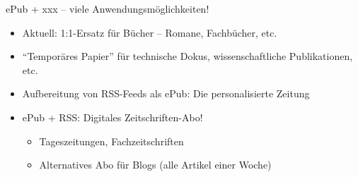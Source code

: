 \begin{frame}{ePub + xxx -- viele Anwendungsmöglichkeiten!}
	\begin{itemize}
		\item Aktuell: 1:1-Ersatz für Bücher -- Romane, Fachbücher, etc.
		\item "`Temporäres Papier"' für technische Dokus, wissenschaftliche Publikationen, etc.
		\item<2-> Aufbereitung von RSS-Feeds als ePub: Die personalisierte Zeitung
		\item<3-> ePub + RSS: Digitales Zeitschriften-Abo!
		\begin{itemize}
			\item Tageszeitungen, Fachzeitschriften
			\item Alternatives Abo für Blogs (alle Artikel einer Woche)
		\end{itemize}
	\end{itemize}
\end{frame}

